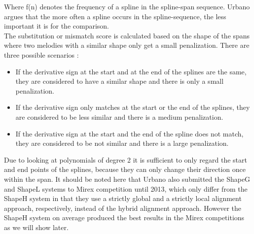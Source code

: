 \documentclass{llncs}
\begin{document}
\begin{itemize}
        Where f(n) denotes the frequency of a spline in the spline-span sequence. Urbano argues that the more often a spline occurs in the spline-sequence, the less important it is for the comparison. \\
        The substitution or mismatch score is calculated based on the shape of the spans where two melodies with a similar shape only get a small penalization. There are three possible scenarios : 
        \begin{itemize}
         \item If the derivative sign at the start and at the end of the splines are the same, they are considered to have a similar shape and there is only a small penalization.
         \item If the derivative sign only matches at the start or the end of the splines, they are considered to be less similar and there is a medium penalization.
         \item If the derivative sign at the start and the end of the spline does not match, they are considered to be not similar and there is a large penalization.
        \end{itemize}
        Due to looking at polynomials of degree 2 it is sufficient to only regard the start and end points of the splines, because they can only change their direction once within the span.
        It should be noted here that Urbano also submitted the ShapeG and ShapeL systems to Mirex competition until 2013, which only differ from the ShapeH system in that they use a strictly global and a strictly local alignment approach, respectively, instead of the hybrid alignment approach. However the ShapeH system on average produced the best results in the Mirex competitions as we will show later.
  
		

\end{itemize}
\end{document}
